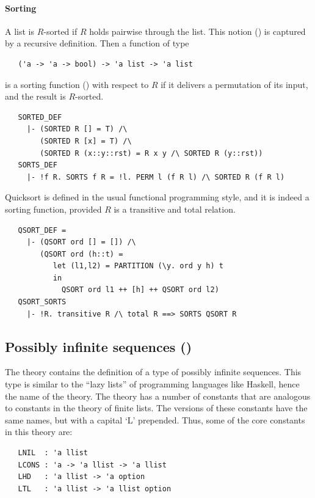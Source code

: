{\paragraph{Sorting}

A list is $R$-sorted if $R$ holds pairwise through the list. This
notion () is captured by a recursive definition. Then
a function of type
%
\begin{hol}
\begin{verbatim}
   ('a -> 'a -> bool) -> 'a list -> 'a list
\end{verbatim}
\end{hol}
%
is a sorting function () with respect to $R$ if
it delivers a permutation of its input, and the result is $R$-sorted.
%
\begin{hol}
\begin{verbatim}
   SORTED_DEF
     |- (SORTED R [] = T) /\
        (SORTED R [x] = T) /\
        (SORTED R (x::y::rst) = R x y /\ SORTED R (y::rst))
   SORTS_DEF
     |- !f R. SORTS f R = !l. PERM l (f R l) /\ SORTED R (f R l)
\end{verbatim}
\end{hol}
%
Quicksort is defined in the usual functional programming style, and
it is indeed a sorting function, provided $R$ is a transitive and
total relation.
%
\begin{hol}
\begin{verbatim}
   QSORT_DEF =
     |- (QSORT ord [] = []) /\
        (QSORT ord (h::t) =
           let (l1,l2) = PARTITION (\y. ord y h) t
           in
             QSORT ord l1 ++ [h] ++ QSORT ord l2)
   QSORT_SORTS
     |- !R. transitive R /\ total R ==> SORTS QSORT R
\end{verbatim}
\end{hol}




\subsection{Possibly infinite sequences (\theoryimp{llist})}


The theory  contains the definition of a type of
possibly infinite sequences.  This type is similar to the ``lazy
lists'' of programming languages like Haskell, hence the name of the
theory.  The \theoryimp{llist} theory has a number of constants that
are analogous to constants in the theory of finite
lists.  The \theoryimp{llist} versions of these constants have the
same names, but with a capital `L\/' prepended.  Thus, some of the core
constants in this theory are:
\begin{hol}
\begin{verbatim}
   LNIL  : 'a llist
   LCONS : 'a -> 'a llist -> 'a llist
   LHD   : 'a llist -> 'a option
   LTL   : 'a llist -> 'a llist option
\end{verbatim}
\end{hol}

}
